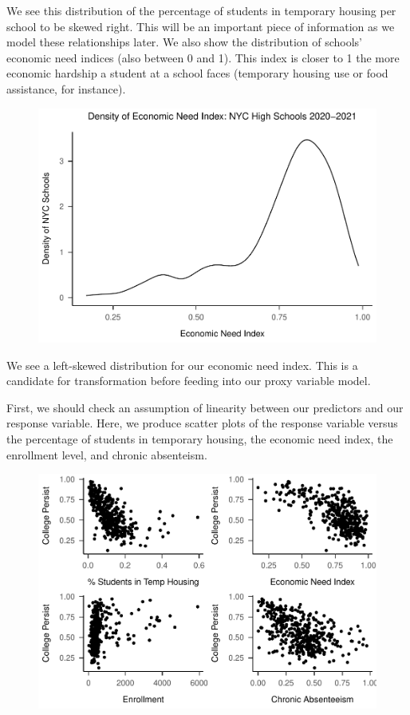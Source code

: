 \documentclass[
  man,floatsintext]{apa6}
\begin{document}
We see this distribution of the percentage of students in temporary housing per school to be skewed right. This will be an important piece of information as we model these relationships later. We also show the distribution of schools' economic need indices (also between 0 and 1). This index is closer to 1 the more economic hardship a student at a school faces (temporary housing use or food assistance, for instance).

\begin{figure}[H]
\includegraphics[width=\textwidth]{final-project_files/figure-latex/economic-need-index-1} \caption{ }\label{fig:economic-need-index}
\end{figure}

We see a left-skewed distribution for our economic need index. This is a candidate for transformation before feeding into our proxy variable model.

First, we should check an assumption of linearity between our predictors and our response variable. Here, we produce scatter plots of the response variable versus the percentage of students in temporary housing, the economic need index, the enrollment level, and chronic absenteism.

\begin{figure}[H]
\includegraphics[width=\textwidth]{final-project_files/figure-latex/unnamed-chunk-6-1} \caption{ }\label{fig:unnamed-chunk-6}
\end{figure}
\end{document}
